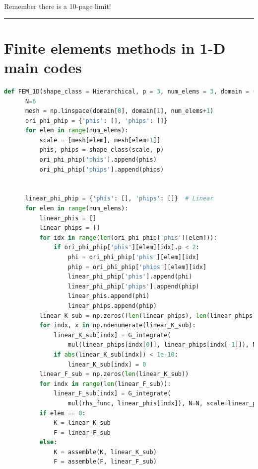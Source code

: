 \documentclass[twoside,twocolumn,10pt]{article}
\begin{document}



\Large{Remember there is a 10-page limit!}
\hrule 
\newpage
\appendix
\section{Finite elements methods in 1-D main codes}
\label{Apdx:FEM_1D}
\begin{lstlisting}[language=Python, caption=Finite elements methods in 1-D main code]
  def FEM_1D(shape_class = Hierarchical, p = 3, num_elems = 3, domain = (0, 1),rhs_func = rhs_fn(a=50, xb=0.8), exact_func=exact_fn(0.5,0.8), BCs = (0, 0), verbose = False):
      N=6
      mesh = np.linspace(domain[0], domain[1], num_elems+1)
      ori_phi_phip = {'phis': [], 'phips': []}
      for elem in range(num_elems):
          scale = [mesh[elem], mesh[elem+1]]
          phis, phips = shape_class(scale, p)
          ori_phi_phip['phis'].append(phis)
          ori_phi_phip['phips'].append(phips)
  
  
      linear_phi_phip = {'phis': [], 'phips': []}  # Linear
      for elem in range(num_elems):
          linear_phis = []
          linear_phips = []
          for idx in range(len(ori_phi_phip['phis'][elem])):
              if ori_phi_phip['phis'][elem][idx].p < 2:
                  phi = ori_phi_phip['phis'][elem][idx]
                  phip = ori_phi_phip['phips'][elem][idx]
                  linear_phi_phip['phis'].append(phi)
                  linear_phi_phip['phips'].append(phip)
                  linear_phis.append(phi)
                  linear_phips.append(phip)
          linear_K_sub = np.zeros((len(linear_phips), len(linear_phips)))
          for indx, x in np.ndenumerate(linear_K_sub):
              linear_K_sub[indx] = G_integrate(
                  mul(linear_phips[indx[0]], linear_phips[indx[-1]]), N=6, scale=linear_phips[indx[0]].scale)
              if abs(linear_K_sub[indx]) < 1e-10:
                  linear_K_sub[indx] = 0
          linear_F_sub = np.zeros(len(linear_K_sub))
          for indx in range(len(linear_F_sub)):
              linear_F_sub[indx] = G_integrate(
                  mul(rhs_func, linear_phis[indx]), N=N, scale=linear_phis[indx].scale)
          if elem == 0:
              K = linear_K_sub
              F = linear_F_sub
          else:
              K = assemble(K, linear_K_sub)
              F = assemble(F, linear_F_sub)
              

\end{lstlisting}
\end{document}
